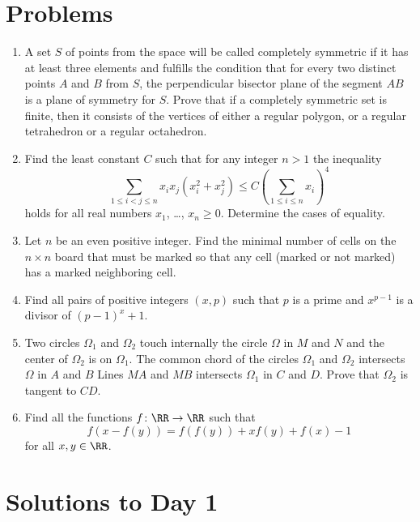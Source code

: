 \documentclass[11pt]{scrartcl}
\begin{document}
\section{Problems}
\begin{enumerate}[\bfseries 1.]
\item %
A set $S$ of points from the space will be called
completely symmetric if it has at least three elements
and fulfills the condition that for every two distinct points
$A$ and $B$ from $S$,
the perpendicular bisector plane of the segment $AB$
is a plane of symmetry for $S$.
Prove that if a completely symmetric set is finite,
then it consists of the vertices of either a regular polygon,
or a regular tetrahedron or a regular octahedron.

\item %
Find the least constant $C$ such that
for any integer $n > 1$ the inequality
\[\sum_{1 \le i < j \le n} x_i x_j (x_i^2 + x_j^2)
  \le C \left( \sum_{1 \le i \le n} x_i \right)^4\]
holds for all real numbers $x_1$, \dots, $x_n \ge 0$.
Determine the cases of equality.

\item %
Let $n$ be an even positive integer.
Find the minimal number of cells on the $n \times n$ board
that must be marked so that any cell
(marked or not marked) has a marked neighboring cell.

\item %
Find all pairs of positive integers $(x,p)$
such that $p$ is a prime and $x^{p-1}$ is a divisor of $ (p-1)^{x}+1$.

\item %
Two circles $\Omega_{1}$ and $\Omega_{2}$ touch internally the circle
$\Omega$ in $M$ and $N$ and the center of $\Omega_{2}$ is on $\Omega_{1}$.
The common chord of the circles $\Omega_{1}$ and $\Omega_{2}$
intersects $\Omega$ in $A$ and $B$
Lines $MA$ and $MB$ intersects $\Omega_{1}$ in $C$ and $D$.
Prove that $\Omega_{2}$ is tangent to $CD$.

\item %
Find all the functions $f \colon \RR \to \RR$ such that
\[f(x-f(y))=f(f(y))+xf(y)+f(x)-1\]
for all $x,y \in \RR$.

\end{enumerate}
\pagebreak

\section{Solutions to Day 1}
\end{document}
